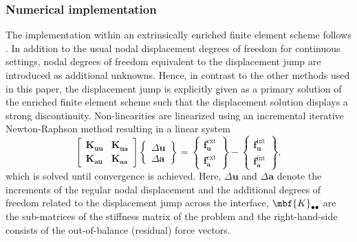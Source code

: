 \subsubsection*{Numerical implementation}
The implementation within an extrinsically enriched finite element scheme follows \cite{Watanabe2012}. In addition to the usual nodal displacement degrees of freedom for continuous settings, nodal degrees of freedom equivalent to the displacement jump are introduced as additional unknowns. Hence, in contrast to the other methods used in this paper, the displacement jump is explicitly given as a primary solution of the enriched finite element scheme such that the displacement solution displays a strong discontinuity. Non-linearities are linearized using an incremental iterative Newton-Raphson method resulting in a linear system
\[
\begin{bmatrix}
\mathbf{K_{uu}} & \mathbf{K_{ua}} \\
\mathbf{K_{au}} & \mathbf{K_{aa}}
\end{bmatrix}
\begin{Bmatrix}
\Delta\mathbf{u} \\
\Delta\mathbf{a}
\end{Bmatrix}
=
\begin{Bmatrix}
\mathbf{f}^{\mathrm{ext}}_{\mathbf{u}}  \\
\mathbf{f}^{\mathrm{ext}}_{\mathbf{a}} 
\end{Bmatrix}
-
\begin{Bmatrix}
\mathbf{f}^{\mathrm{int}}_{\mathbf{u}}  \\
\mathbf{f}^{\mathrm{int}}_{\mathbf{a}} 
\end{Bmatrix},
\label{eq:LIE_num}
\]
which is solved until convergence is achieved. Here, $\Delta \mathbf{u}$ and $\Delta \mathbf{a}$ denote the increments of the regular nodal displacement and the additional degrees of freedom related to the displacement jump across the interface, $\mbf{K}_{\bullet \bullet}$ are the sub-matrices of the stiffness matrix of the problem and the right-hand-side consists of the out-of-balance (residual) force vectors.